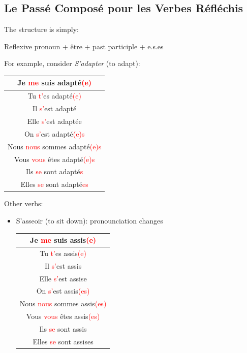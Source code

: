 \documentclass{book}
\begin{document}
\subsection{Le Passé Composé pour les Verbes Réfléchis}
The structure is simply:
\begin{center}
    Reflexive pronoun + être + past participle + e.s.es
\end{center}
For example, consider \textit{S'adapter} (to adapt):
\begin{center}
    \begin{tabular}{|c|}
        \hline
        Je \textcolor{red}{me} suis adapté\textcolor{red}{(e)} \\
        \hline
        Tu \textcolor{red}{t'}es adapté\textcolor{red}{(e)} \\
        \hline
        Il \textcolor{red}{s'}est adapté \\
        \hline
        Elle \textcolor{red}{s'}est adaptée \\
        \hline
        On \textcolor{red}{s'}est adapté\textcolor{red}{(e)s} \\
        \hline
        Nous \textcolor{red}{nous} sommes adapté\textcolor{red}{(e)s} \\
        \hline
        Vous \textcolor{red}{vous} êtes adapté\textcolor{red}{(e)s} \\
        \hline
        Ils \textcolor{red}{se} sont adapté\textcolor{red}{s} \\
        \hline
        Elles \textcolor{red}{se} sont adapté\textcolor{red}{es} \\
        \hline
    \end{tabular}
\end{center}
Other verbs:
\begin{itemize}
    \item S'asseoir (to sit down): pronounciation changes
    \begin{center}
        \begin{tabular}{|c|}
            \hline
            Je \textcolor{red}{me} suis assis\textcolor{red}{(e)} \\
            \hline
            Tu \textcolor{red}{t'}es assis\textcolor{red}{(e)} \\
            \hline
            Il \textcolor{red}{s'}est assis \\
            \hline
            Elle \textcolor{red}{s'}est assise \\
            \hline
            On \textcolor{red}{s'}est assis\textcolor{red}{(es)} \\
            \hline
            Nous \textcolor{red}{nous} sommes assis\textcolor{red}{(es)} \\
            \hline
            Vous \textcolor{red}{vous} êtes assis\textcolor{red}{(es)} \\
            \hline
            Ils \textcolor{red}{se} sont assis \\
            \hline
            Elles \textcolor{red}{se} sont assises \\
            \hline
        \end{tabular}
    \end{center}
\end{itemize}
\end{document}
